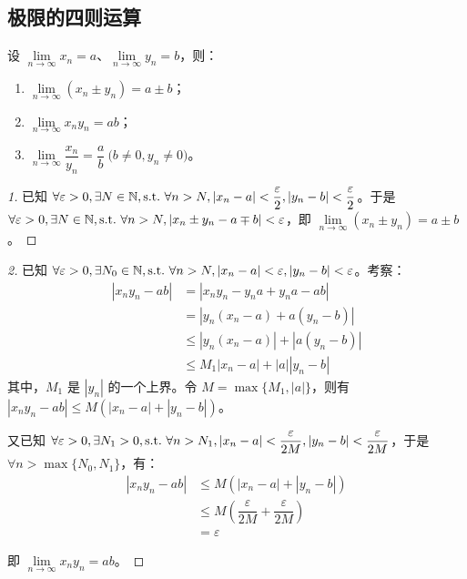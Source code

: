 \subsection{极限的四则运算}

\begin{theorem}
	设 $\lim\limits_{n \rightarrow \infty} x_n = a$、$\lim\limits_{n \rightarrow \infty} y_n = b$，则：

	\begin{enumerate}
		\item $\lim\limits_{n \rightarrow \infty} (x_n \pm y_n) = a \pm b$；
		\item $\lim\limits_{n \rightarrow \infty} x_n y_n = ab$；
		\item $\lim\limits_{n \rightarrow \infty} \dfrac{x_n}{y_n} = \dfrac{a}{b} \pod{b \ne 0, y_n \ne 0}$。
	\end{enumerate}
\end{theorem}

\begin{proof}[1]
	已知 $\forall \varepsilon > 0, \exists N \in \mathbb N, \text{s.t.~} \forall n > N, |x_n - a| < \dfrac{\varepsilon}{2}, |y_n - b| < \dfrac{\varepsilon}{2}$。于是 $\forall \varepsilon > 0, \exists N \in \mathbb N, \text{s.t.~} \forall n > N, |x_n \pm y_n - a \mp b| < \varepsilon$，即 $\lim\limits_{n \rightarrow \infty} (x_n \pm y_n) = a \pm b$。
\end{proof}

\begin{proof}[2]
	已知 $\forall \varepsilon > 0, \exists N_0 \in \mathbb N, \text{s.t.~} \forall n > N, |x_n - a| < \varepsilon, |y_n - b| < \varepsilon$。考察：
	$$
	\begin{aligned}
		|x_n y_n - ab| &= |x_n y_n - y_n a + y_n a - ab|
		\\&=
		|y_n(x_n - a) + a(y_n - b)|
		\\&\le
		|y_n(x_n - a)| + |a(y_n - b)|
		\\&\le
		M_1 |x_n - a| + |a||y_n - b|
	\end{aligned}
	$$
	其中，$M_1$ 是 $|y_n|$ 的一个上界。令 $M = \max\{M_1, |a|\}$，则有 $|x_n y_n - ab| \le M(|x_n - a| + |y_n - b|)$。

	又已知 $\forall \varepsilon > 0, \exists N_1 > 0, \text{s.t.~} \forall n > N_1, |x_n - a| < \dfrac{\varepsilon}{2M}, |y_n - b| < \dfrac{\varepsilon}{2M}$，于是 $\forall n > \max\{N_0, N_1\}$，有：
	$$
	\begin{aligned}
		|x_n y_n - ab| &\le M (|x_n - a| + |y_n - b|)
		\\&\le
		M(\dfrac{\varepsilon}{2M} + \dfrac{\varepsilon}{2M})
		\\&=
		\varepsilon
	\end{aligned}
	$$

	即 $\lim\limits_{n \rightarrow \infty} x_n y_n = ab$。
\end{proof}

